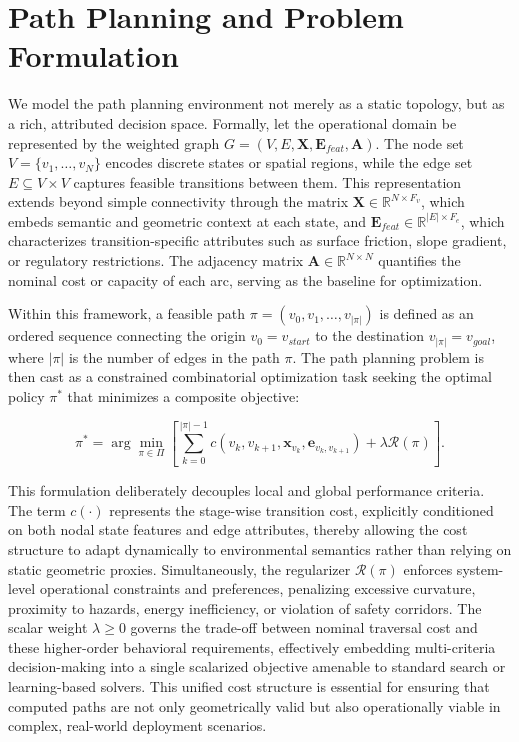 \documentclass[10pt,twoside]{article}
\numberwithin{equation}{section}
\begin{document}
	




	\section{Path Planning and Problem Formulation}


	We model the path planning environment not merely as a static topology, but as a rich, attributed decision space. Formally, let the operational domain be represented by the weighted graph $G = (V, E, \mathbf{X}, \mathbf{E}_{feat}, \mathbf{A})$. The node set $V = \{v_1, \dots, v_N\}$ encodes discrete states or spatial regions, while the edge set $E \subseteq V \times V$ captures feasible transitions between them. This representation extends beyond simple connectivity through the matrix $\mathbf{X} \in \mathbb{R}^{N \times F_v}$, which embeds semantic and geometric context at each state, and $\mathbf{E}_{feat} \in \mathbb{R}^{|E| \times F_e}$, which characterizes transition-specific attributes such as surface friction, slope gradient, or regulatory restrictions. The adjacency matrix $\mathbf{A} \in \mathbb{R}^{N \times N}$ quantifies the nominal cost or capacity of each arc, serving as the baseline for optimization. 	


	Within this framework, a feasible path $\pi = (v_0, v_1, \dots, v_{|\pi|})$ is defined as an ordered sequence connecting the origin $v_0 = v_{start}$ to the destination $v_{|\pi|} = v_{goal}$, where $|\pi|$ is the number of edges in the path $\pi$. The path planning problem is then cast as a constrained combinatorial optimization task seeking the optimal policy $\pi^*$ that minimizes a composite objective:


	\begin{equation}\label{eq:path_cost}


		\pi^* = \arg\min_{\pi \in \Pi} \left[ \sum_{k=0}^{|\pi|-1} c(v_k, v_{k+1}, \mathbf{x}_{v_k}, \mathbf{e}_{v_k, v_{k+1}}) + \lambda \mathcal{R}(\pi) \right].


	\end{equation}


	This formulation deliberately decouples local and global performance criteria. The term $c(\cdot)$ represents the stage-wise transition cost, explicitly conditioned on both nodal state features and edge attributes, thereby allowing the cost structure to adapt dynamically to environmental semantics rather than relying on static geometric proxies. Simultaneously, the regularizer $\mathcal{R}(\pi)$ enforces system-level operational constraints and preferences, penalizing excessive curvature, proximity to hazards, energy inefficiency, or violation of safety corridors. The scalar weight $\lambda \geq 0$ governs the trade-off between nominal traversal cost and these higher-order behavioral requirements, effectively embedding multi-criteria decision-making into a single scalarized objective amenable to standard search or learning-based solvers. This unified cost structure is essential for ensuring that computed paths are not only geometrically valid but also operationally viable in complex, real-world deployment scenarios.
\end{document}

